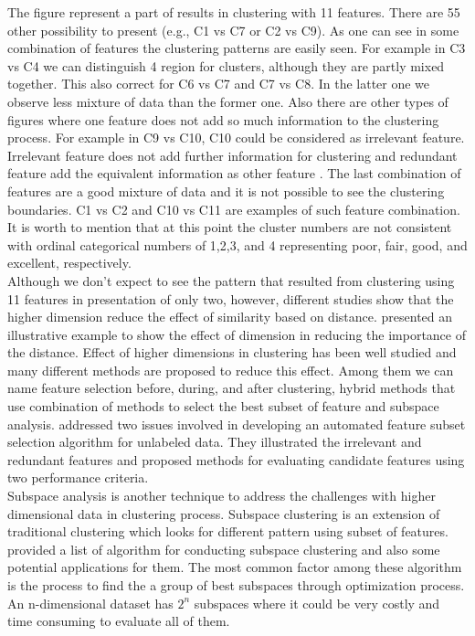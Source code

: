 The figure represent a part of results in clustering with 11 features. There are 55 other possibility to present (e.g., C1 vs C7 or C2 vs C9). As one can see in some combination of features the clustering patterns are easily seen. For example in C3 vs C4 we can distinguish 4 region for clusters, although they are partly mixed together. This also correct for C6 vs C7 and C7 vs C8. In the latter one we observe less mixture of data than the former one. Also there are other types of figures where one feature does not add so much information to the clustering process. For example in C9 vs C10, C10 could be considered as irrelevant feature. Irrelevant feature does not add further information for clustering and redundant feature add the equivalent information as other feature \citep{Dy_2004_MLR}. The last combination of features are a good mixture of data and it is not possible to see the clustering boundaries. C1 vs C2 and C10 vs C11 are examples of such feature combination. It is worth to mention that at this point the cluster numbers are not consistent with ordinal categorical numbers of 1,2,3, and 4 representing poor, fair, good, and excellent, respectively.\\   
Although we don't expect to see the pattern that resulted from clustering using 11 features in presentation of only two, however, different studies show that the higher dimension reduce the effect of similarity based on distance. \citet{Parsons_2004_ACM} presented an illustrative example to show the effect of dimension in reducing the importance of the distance. Effect of higher dimensions in clustering has been well studied and many different methods are proposed to reduce this effect. Among them we can name  feature selection before, during, and after clustering, hybrid methods that use combination of methods to select the best subset of feature and subspace analysis. \citet{Dy_2004_MLR} addressed two issues involved in developing an automated feature subset selection algorithm for unlabeled data. They illustrated the irrelevant and redundant features and proposed methods for evaluating candidate features using two performance criteria. \\
Subspace analysis is another technique to address the challenges with higher dimensional data in clustering process. Subspace clustering is an extension of traditional clustering which looks for different pattern using subset of features.  \citet{Parsons_2004_ACM} provided a list of algorithm for conducting subspace clustering and also some potential applications for them. The most common factor among these algorithm is the process to find the a group of best subspaces through optimization process. An n-dimensional dataset has $2^n$ subspaces where it could be very costly and time consuming to evaluate all of them.\\
